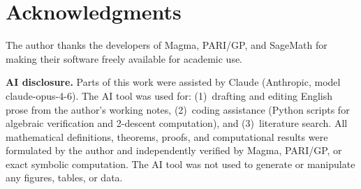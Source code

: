 \documentclass[11pt]{amsart}
\theoremstyle{plain}
\theoremstyle{definition}
\theoremstyle{remark}
\begin{document}
\section*{Acknowledgments}

The author thanks the developers of Magma, PARI/GP, and SageMath for making
their software freely available for academic use.

\medskip\noindent\textbf{AI disclosure.}
Parts of this work were assisted by Claude (Anthropic, model claude-opus-4-6).
The AI tool was used for: (1)~drafting and editing English prose from the
author's working notes, (2)~coding assistance (Python scripts for algebraic
verification and 2-descent computation), and (3)~literature search.
All mathematical definitions, theorems, proofs, and computational results
were formulated by the author and independently verified by Magma, PARI/GP,
or exact symbolic computation.  The AI tool was not used to generate or
manipulate any figures, tables, or data.



\end{document}

